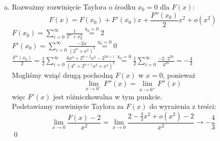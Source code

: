 \documentclass[11pt]{article}
\newcommand{\Dis}{\displaystyle}
\begin{document}
\begin{enumerate}[(a)]
    \newpage
    \item Rozważmy rozwinięcie Taylora o środku $x_0 = 0$ dla $F(x)$:
    $$F(x) = F(x_0) + F'(x_0)x + \frac{F''(x_0)}{2}x^2 + o(x^2)$$
    $\Dis F(x_0) = \sum_{i = 0}^\infty \frac{1}{2^n + x_0^2} \overset{\mathrm{x_0 = 0}}{=} 2$ \\[5pt]
    $\Dis F'(x_0) = \sum_{i = 0}^\infty \frac{-2x}{(2^n+x^2)^2} \overset{\mathrm{x_0 = 0}}{=} 0$ \\[5pt]
    $\Dis \frac{F''(x_0)}{2} = \frac{1}{2}\sum_{i = 0}^\infty \frac{6x^4 + 2^{n+2}x^2 - 2^{2n+1}}{(4^n + 2^{n+1}x^2 + x^4)^2} \overset{\mathrm{x_0 = 0}}{=} \frac{1}{2} \sum_{i = 0}^\infty \frac{-2 \cdot 2^{2n}}{4^{2n}} = -\frac{4}{3}$ \\[5pt]
    Mogliśmy wziąć drugą pochodną $F(x)$ w $x = 0$, ponieważ 
    $$\lim_{x\to 0^-} F''(x) = \lim_{x\to 0^+} F''(x)$$
    więc $F'(x)$ jest różniczkowalna w tym punkcie. \\[10pt]
    Podstawiamy rozwinięcie Taylora za $F(x)$ do wyrażenia z treści:
    $$\lim_{x \to 0} \frac{F(x) - 2}{x^2} = \lim_{x \to 0} \frac{2 - \frac{4}{3}x^2 + o(x^2) - 2}{x^2} \to - \frac{4}{3}$$ \qed
\end{enumerate}
\end{document}
